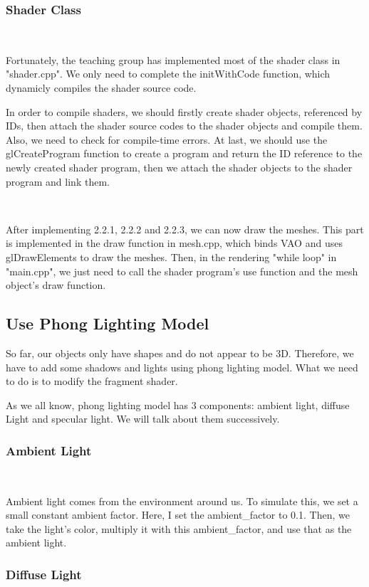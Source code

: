 \documentclass[acmtog]{acmart}
\begin{document}
\subsubsection{Shader Class}
~

Fortunately, the teaching group has implemented most of the shader class in "shader.cpp". We only need to complete the initWithCode function, which dynamicly compiles the shader source code. 

In order to compile shaders, we should firstly create shader objects, referenced by IDs, then attach the shader source codes to the shader objects and compile them. Also, we need to check for compile-time errors.
At last, we should use the glCreateProgram function to create a program and return the ID reference to the newly created shader program, then we attach the shader objects to the shader program and link them.

~

After implementing 2.2.1, 2.2.2 and 2.2.3, we can now draw the meshes. This part is implemented in the draw function in mesh.cpp, which binds VAO and uses glDrawElements to draw the meshes.
Then, in the rendering "while loop" in "main.cpp", we just need to call the shader program's use function and the mesh object's draw function.

\subsection{Use Phong Lighting Model}
\quad
So far, our objects only have shapes and do not appear to be 3D. Therefore, we have to add some shadows and lights using phong lighting model.
What we need to do is to modify the fragment shader. 

As we all know, phong lighting model has 3 components: ambient light, diffuse Light and specular light. We will talk about them successively.
\subsubsection{Ambient Light}
~

Ambient light comes from the environment around us. 
To simulate this, we set a small constant ambient factor. Here, I set the ambient\_factor to 0.1.
Then, we take the light's color, multiply it with this ambient\_factor, and use that as the ambient light.


\subsubsection{Diffuse Light}
~
\end{document}

